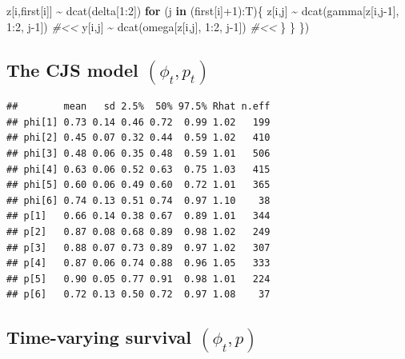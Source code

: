 \documentclass[
  12pt,
]{krantz}
\newenvironment{Shaded}{\begin{snugshade}}{\end{snugshade}}
\newcommand{\CommentTok}[1]{\textcolor[rgb]{0.56,0.35,0.01}{\textit{#1}}}
\newcommand{\ControlFlowTok}[1]{\textcolor[rgb]{0.13,0.29,0.53}{\textbf{#1}}}
\newcommand{\DecValTok}[1]{\textcolor[rgb]{0.00,0.00,0.81}{#1}}
\newcommand{\FunctionTok}[1]{\textcolor[rgb]{0.00,0.00,0.00}{#1}}
\newcommand{\NormalTok}[1]{#1}
\newcommand{\SpecialCharTok}[1]{\textcolor[rgb]{0.00,0.00,0.00}{#1}}
\begin{document}
\begin{Shaded}
\begin{Highlighting}[]
\NormalTok{    z[i,first[i]] }\SpecialCharTok{\textasciitilde{}} \FunctionTok{dcat}\NormalTok{(delta[}\DecValTok{1}\SpecialCharTok{:}\DecValTok{2}\NormalTok{])}
    \ControlFlowTok{for}\NormalTok{ (j }\ControlFlowTok{in}\NormalTok{ (first[i]}\SpecialCharTok{+}\DecValTok{1}\NormalTok{)}\SpecialCharTok{:}\NormalTok{T)\{}
\NormalTok{      z[i,j] }\SpecialCharTok{\textasciitilde{}} \FunctionTok{dcat}\NormalTok{(gamma[z[i,j}\DecValTok{{-}1}\NormalTok{], }\DecValTok{1}\SpecialCharTok{:}\DecValTok{2}\NormalTok{, j}\DecValTok{{-}1}\NormalTok{]) }\CommentTok{\#\textless{}\textless{}}
\NormalTok{      y[i,j] }\SpecialCharTok{\textasciitilde{}} \FunctionTok{dcat}\NormalTok{(omega[z[i,j], }\DecValTok{1}\SpecialCharTok{:}\DecValTok{2}\NormalTok{, j}\DecValTok{{-}1}\NormalTok{]) }\CommentTok{\#\textless{}\textless{}}
\NormalTok{    \}}
\NormalTok{  \}}
\NormalTok{\})}
\end{Highlighting}
\end{Shaded}

\hypertarget{the-cjs-model-phi_t-p_t-5}{%
\subsection{\texorpdfstring{The CJS model \((\phi_t, p_t)\)}{The CJS model (\textbackslash phi\_t, p\_t)}}\label{the-cjs-model-phi_t-p_t-5}}

\begin{verbatim}
##        mean   sd 2.5%  50% 97.5% Rhat n.eff
## phi[1] 0.73 0.14 0.46 0.72  0.99 1.02   199
## phi[2] 0.45 0.07 0.32 0.44  0.59 1.02   410
## phi[3] 0.48 0.06 0.35 0.48  0.59 1.01   506
## phi[4] 0.63 0.06 0.52 0.63  0.75 1.03   415
## phi[5] 0.60 0.06 0.49 0.60  0.72 1.01   365
## phi[6] 0.74 0.13 0.51 0.74  0.97 1.10    38
## p[1]   0.66 0.14 0.38 0.67  0.89 1.01   344
## p[2]   0.87 0.08 0.68 0.89  0.98 1.02   249
## p[3]   0.88 0.07 0.73 0.89  0.97 1.02   307
## p[4]   0.87 0.06 0.74 0.88  0.96 1.05   333
## p[5]   0.90 0.05 0.77 0.91  0.98 1.01   224
## p[6]   0.72 0.13 0.50 0.72  0.97 1.08    37
\end{verbatim}

\hypertarget{time-varying-survival-phi_t-p}{%
\subsection{\texorpdfstring{Time-varying survival \((\phi_t, p)\)}{Time-varying survival (\textbackslash phi\_t, p)}}\label{time-varying-survival-phi_t-p}}
\end{document}
